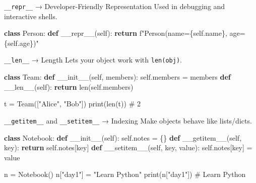 \documentclass[
  letterpaper,
  DIV=11,
  numbers=noendperiod]{scrreprt}
\newenvironment{Shaded}{\begin{snugshade}}{\end{snugshade}}
\newcommand{\BuiltInTok}[1]{\textcolor[rgb]{0.00,0.23,0.31}{#1}}
\newcommand{\CommentTok}[1]{\textcolor[rgb]{0.37,0.37,0.37}{#1}}
\newcommand{\ControlFlowTok}[1]{\textcolor[rgb]{0.00,0.23,0.31}{\textbf{#1}}}
\newcommand{\FunctionTok}[1]{\textcolor[rgb]{0.28,0.35,0.67}{#1}}
\newcommand{\KeywordTok}[1]{\textcolor[rgb]{0.00,0.23,0.31}{\textbf{#1}}}
\newcommand{\NormalTok}[1]{\textcolor[rgb]{0.00,0.23,0.31}{#1}}
\newcommand{\OperatorTok}[1]{\textcolor[rgb]{0.37,0.37,0.37}{#1}}
\newcommand{\SpecialCharTok}[1]{\textcolor[rgb]{0.37,0.37,0.37}{#1}}
\newcommand{\SpecialStringTok}[1]{\textcolor[rgb]{0.13,0.47,0.30}{#1}}
\newcommand{\StringTok}[1]{\textcolor[rgb]{0.13,0.47,0.30}{#1}}
\newcommand{\VariableTok}[1]{\textcolor[rgb]{0.07,0.07,0.07}{#1}}
\begin{document}
\texttt{\_\_repr\_\_} → Developer-Friendly Representation Used in
debugging and interactive shells.

\begin{Shaded}
\begin{Highlighting}[]
\KeywordTok{class}\NormalTok{ Person:}
    \KeywordTok{def} \FunctionTok{\_\_repr\_\_}\NormalTok{(}\VariableTok{self}\NormalTok{):}
        \ControlFlowTok{return} \SpecialStringTok{f"Person(name=\textquotesingle{}}\SpecialCharTok{\{}\VariableTok{self}\SpecialCharTok{.}\NormalTok{name}\SpecialCharTok{\}}\SpecialStringTok{\textquotesingle{}, age=}\SpecialCharTok{\{}\VariableTok{self}\SpecialCharTok{.}\NormalTok{age}\SpecialCharTok{\}}\SpecialStringTok{)"}
\end{Highlighting}
\end{Shaded}

\texttt{\_\_len\_\_} → Length Lets your object work with
\texttt{len(obj)}.

\begin{Shaded}
\begin{Highlighting}[]
\KeywordTok{class}\NormalTok{ Team:}
    \KeywordTok{def} \FunctionTok{\_\_init\_\_}\NormalTok{(}\VariableTok{self}\NormalTok{, members):}
        \VariableTok{self}\NormalTok{.members }\OperatorTok{=}\NormalTok{ members}
    \KeywordTok{def} \FunctionTok{\_\_len\_\_}\NormalTok{(}\VariableTok{self}\NormalTok{):}
        \ControlFlowTok{return} \BuiltInTok{len}\NormalTok{(}\VariableTok{self}\NormalTok{.members)}

\NormalTok{t }\OperatorTok{=}\NormalTok{ Team([}\StringTok{"Alice"}\NormalTok{, }\StringTok{"Bob"}\NormalTok{])}
\BuiltInTok{print}\NormalTok{(}\BuiltInTok{len}\NormalTok{(t))   }\CommentTok{\# 2}
\end{Highlighting}
\end{Shaded}

\texttt{\_\_getitem\_\_} and \texttt{\_\_setitem\_\_} → Indexing Make
objects behave like lists/dicts.

\begin{Shaded}
\begin{Highlighting}[]
\KeywordTok{class}\NormalTok{ Notebook:}
    \KeywordTok{def} \FunctionTok{\_\_init\_\_}\NormalTok{(}\VariableTok{self}\NormalTok{):}
        \VariableTok{self}\NormalTok{.notes }\OperatorTok{=}\NormalTok{ \{\}}
    \KeywordTok{def} \FunctionTok{\_\_getitem\_\_}\NormalTok{(}\VariableTok{self}\NormalTok{, key):}
        \ControlFlowTok{return} \VariableTok{self}\NormalTok{.notes[key]}
    \KeywordTok{def} \FunctionTok{\_\_setitem\_\_}\NormalTok{(}\VariableTok{self}\NormalTok{, key, value):}
        \VariableTok{self}\NormalTok{.notes[key] }\OperatorTok{=}\NormalTok{ value}

\NormalTok{n }\OperatorTok{=}\NormalTok{ Notebook()}
\NormalTok{n[}\StringTok{"day1"}\NormalTok{] }\OperatorTok{=} \StringTok{"Learn Python"}
\BuiltInTok{print}\NormalTok{(n[}\StringTok{"day1"}\NormalTok{])   }\CommentTok{\# Learn Python}
\end{Highlighting}
\end{Shaded}
\end{document}
